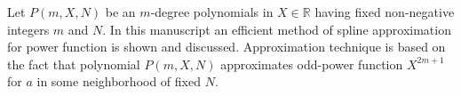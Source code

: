 ﻿Let $P(m, X, N)$ be an $m$-degree polynomials in $X\in\mathbb{R}$
having fixed non-negative integers $m$ and $N$.
In this manuscript an efficient method of spline approximation for power function is shown and discussed.
Approximation technique is based on the fact that polynomial $P(m, X, N)$
approximates odd-power function $X^{2m+1}$ for $a$ in some neighborhood of fixed $N$.
